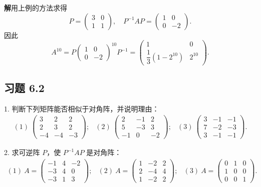 \documentclass[UTF8,12pt,a4paper,fontset=fandol]{ctexart}
\begin{document}
\noindent\textbf{解}\quad 用上例的方法求得
\[
P=\left(\begin{array}{cc}
3 & 0\\
1 & 1
\end{array}\right),\quad
P^{-1}AP=\left(\begin{array}{cc}
1 & 0\\
0 & -2
\end{array}\right).
\]
因此
\[
A^{10}=P\left(\begin{array}{cc}
1 & 0\\
0 & -2
\end{array}\right)^{10}P^{-1}
=\left(\begin{array}{cc}
1 & 0\\
\dfrac{1}{3}(1-2^{10}) & 2^{10}
\end{array}\right).
\]

\subsection*{习题 6.2}

1. 判断下列矩阵能否相似于对角阵，并说明理由：
\[
\begin{array}{ccc}
(1)\ \left(\begin{array}{ccc}
3 & 2 & 2\\
2 & 3 & 2\\
-4 & -4 & -3
\end{array}\right);&
(2)\ \left(\begin{array}{ccc}
2 & -1 & 2\\
5 & -3 & 3\\
-1 & 0 & -2
\end{array}\right);&
(3)\ \left(\begin{array}{ccc}
3 & -1 & -1\\
7 & -2 & -3\\
3 & -1 & -1
\end{array}\right).
\end{array}
\]

2. 求可逆阵 $P$，使 $P^{-1}AP$ 是对角阵：
\[
\begin{array}{ccc}
(1)\ A=\left(\begin{array}{ccc}
-1 & 4 & -2\\
-3 & 4 & 0\\
-3 & 1 & 3
\end{array}\right);&
(2)\ A=\left(\begin{array}{ccc}
1 & -2 & 2\\
2 & -4 & 4\\
1 & -2 & 2
\end{array}\right);&
(3)\ A=\left(\begin{array}{ccc}
0 & 1 & 0\\
1 & 0 & 0\\
0 & 0 & 1
\end{array}\right).
\end{array}
\]
\end{document}
